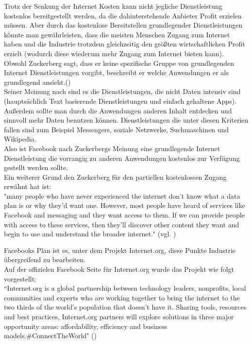 \documentclass{article}
\begin{document}
Trotz der Senkung der Internet Kosten kann nicht jegliche Dienstleistung kostenlos bereitgestellt werden, da die dahinterstehende Anbieter Profit erzielen müssen. 
Aber durch das kostenlose Bereitstellen grundlegender Dienstleistungen könnte man gewährleisten, dass die meisten Menschen Zugang zum Internet haben und die Industrie trotzdem gleichzeitig den größten wirtschaftlichen Profit erzielt (wodurch diese wiederum mehr Zugang zum Internet bieten kann).\\

Obwohl Zuckerberg sagt, dass er keine spezifische Gruppe von grundlegenden Internet Dienstleistungen vorgibt, beschreibt er welche Anwendungen er als grundlegend ansieht.(\cite{HumanRight})\\
Seiner Meinung nach sind es die Dienstleistungen, die nicht Daten intensiv sind (hauptsächlich Text basierende Dienstleistungen und einfach gehaltene Apps). 
Außerdem sollte man durch die Anwendungen anderen Inhalt entdecken und sinnvoll mehr Daten benutzen können.
Dienstleistungen die unter diesen Kriterien fallen sind zum Beispiel Messengers, soziale Netzwerke, Suchmaschinen und Wikipedia.\\

Also ist Facebook nach Zuckerbergs Meinung eine grundlegende Internet Dienstleistung die vorrangig zu anderen Anwendungen kostenlos zur Verfügung gestellt werden sollte.\\
Ein weiterer Grund den Zuckerberg für den partiellen kostenlossen Zugang erwähnt hat ist:\\
"many people who have never experienced the internet don’t know what a data plan is or why they’d want one. 
However, most people have heard of services like Facebook and messaging and they want access to them. If we can provide people 
with access to these services, then they’ll discover other content they want and begin to use 
and understand the broader internet." (vgl. \cite{HumanRight})

\medskip

Facebooks Plan ist es, unter dem Projekt Internet.org, diese Punkte Industrie übergreifend zu bearbeiten. \\
Auf der offizielen Facebook Seite für Internet.org wurde das Projekt wie folgt vorgestellt:\\

``Internet.org is a global partnership between technology leaders, nonprofits, local communities and experts who are working together to bring the internet to the two thirds of the world's population that doesn't have it. Sharing tools, resources and best practices, Internet.org partners will explore solutions in three major opportunity areas: affordability, efficiency and business models.\#ConnectTheWorld" (\cite{InternetOrg})\\
\end{document}
